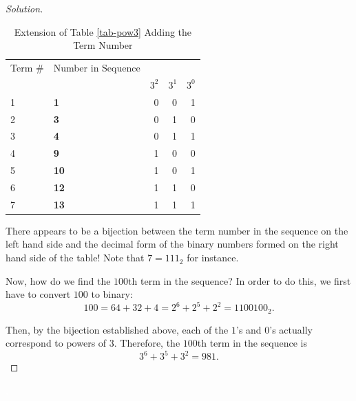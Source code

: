 \begin{proof}[Solution]
\begin{table}[h]
	\centering
	\begin{tabular}{|l|l | r r r|}
		\toprule
		Term \# & Number in Sequence & & &\\
		& & $3^2$ & $3^1$ & $3^0$ \\ 
		\midrule
		1&\textbf{1} & 0 & 0 & 1 \\
		2&\textbf{3} & 0 & 1 & 0 \\
		3&\textbf{4} & 0 & 1 & 1 \\
		4&\textbf{9} & 1 & 0 & 0 \\
		5&\textbf{10} & 1 & 0 & 1 \\
		6&\textbf{12} & 1 & 1 & 0 \\
		7&\textbf{13} & 1 & 1 & 1 \\
		\bottomrule
	\end{tabular}
	\caption{Extension of Table \ref{tab-pow3} Adding the Term Number}
\end{table}

\clearpage

There appears to be a bijection between the term number in the sequence on the left hand side and the decimal form of the binary numbers formed on the right hand side of the table!  Note that $7=111_2$ for instance. 

Now, how do we find the $100$th term in the sequence? In order to do this, we first have to convert $100$ to binary: $$100=64+32+4=2^6+2^5+2^2=1100100_2.$$  

Then, by the bijection established above, each of the $1$'s and $0$'s actually correspond to powers of $3$. Therefore, the $100$th term in the sequence is $$3^6+3^5+3^2=\boxed{981}.$$  \end{proof}



\clearpage



\clearpage
\thispagestyle{empty} %
\textcolor{white}{\cite{a:1}, \cite{me:1}}



\clearpage






